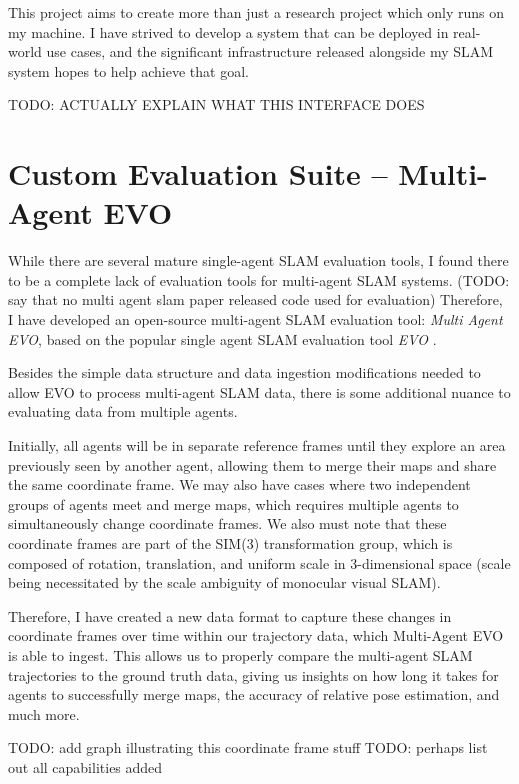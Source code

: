 This project aims to create more than just a research project which only runs on my machine. I have strived to develop a system that can be deployed in real-world use cases, and the significant infrastructure released alongside my SLAM system hopes to help achieve that goal.

TODO: ACTUALLY EXPLAIN WHAT THIS INTERFACE DOES

\section{Custom Evaluation Suite – Multi-Agent EVO}
\label{sec:multi-agent-evo}
While there are several mature single-agent SLAM evaluation tools, I found there to be a complete lack of evaluation tools for multi-agent SLAM systems. (TODO: say that no multi agent slam paper released code used for evaluation) Therefore, I have developed an open-source multi-agent SLAM evaluation tool: \textit{Multi Agent EVO}, based on the popular single agent SLAM evaluation tool \textit{EVO} \autocite{grupp2017evo}.

Besides the simple data structure and data ingestion modifications needed to allow EVO to process multi-agent SLAM data, there is some additional nuance to evaluating data from multiple agents.

Initially, all agents will be in separate reference frames until they explore an area previously seen by another agent, allowing them to merge their maps and share the same coordinate frame. We may also have cases where two independent groups of agents meet and merge maps, which requires multiple agents to simultaneously change coordinate frames. We also must note that these coordinate frames are part of the SIM(3) transformation group, which is composed of rotation, translation, and uniform scale in 3-dimensional space (scale being necessitated by the scale ambiguity of monocular visual SLAM).

Therefore, I have created a new data format to capture these changes in coordinate frames over time within our trajectory data, which Multi-Agent EVO is able to ingest. This allows us to properly compare the multi-agent SLAM trajectories to the ground truth data, giving us insights on how long it takes for agents to successfully merge maps, the accuracy of relative pose estimation, and much more.


TODO: add graph illustrating this coordinate frame stuff
TODO: perhaps list out all capabilities added

